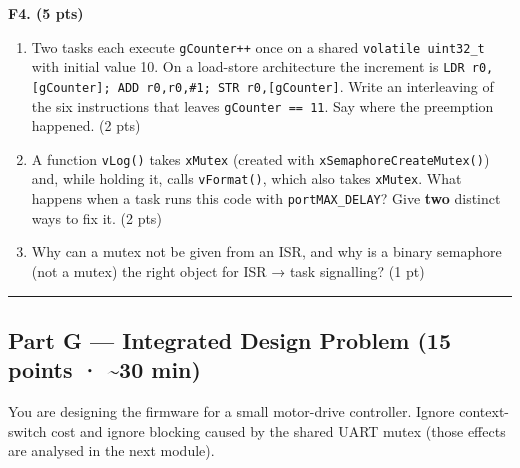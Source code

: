 \documentclass[
  11pt,
]{article}
\begin{document}
\textbf{F4. (5 pts)}

\begin{enumerate}
\def\labelenumi{\alph{enumi}.}
\item
  Two tasks each execute \texttt{gCounter++} once on a shared
  \texttt{volatile\ uint32\_t} with initial value 10. On a load-store
  architecture the increment is
  \texttt{LDR\ r0,{[}gCounter{]};\ ADD\ r0,r0,\#1;\ STR\ r0,{[}gCounter{]}}.
  Write an interleaving of the six instructions that leaves
  \texttt{gCounter\ ==\ 11}. Say where the preemption happened. (2 pts)
\item
  A function \texttt{vLog()} takes \texttt{xMutex} (created with
  \texttt{xSemaphoreCreateMutex()}) and, while holding it, calls
  \texttt{vFormat()}, which also takes \texttt{xMutex}. What happens
  when a task runs this code with \texttt{portMAX\_DELAY}? Give
  \textbf{two} distinct ways to fix it. (2 pts)
\item
  Why can a mutex not be given from an ISR, and why is a binary
  semaphore (not a mutex) the right object for ISR → task signalling? (1
  pt)
\end{enumerate}

\begin{center}\rule{0.5\linewidth}{0.5pt}\end{center}

\subsection{Part G --- Integrated Design Problem (15 points ·
\textasciitilde30
min)}\label{part-g-integrated-design-problem-15-points-30-min}

You are designing the firmware for a small motor-drive controller.
Ignore context-switch cost and ignore blocking caused by the shared UART
mutex (those effects are analysed in the next module).
\end{document}
